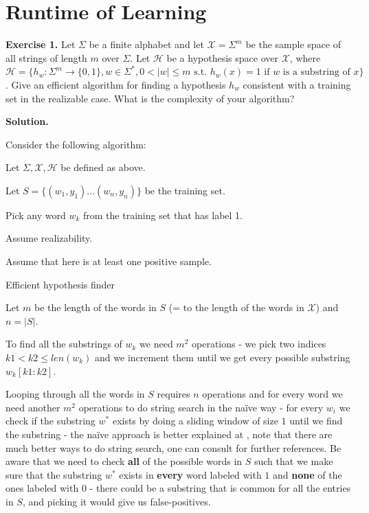 \documentclass{article}
\newcommand{\<}{\langle}
\renewcommand{\>}{\rangle}
\theoremstyle{definition}
\begin{document}
\newpage

\section{Runtime of Learning}

\textbf{Exercise 1.} Let $\Sigma$ be a finite alphabet and let $\mathcal{X}=\Sigma^m$ be the sample space of all strings of length $m$ over $\Sigma$. Let $\mathcal{H}$ be a hypothesis space over $\mathcal{X}$, where $\mathcal{H}=\{h_{w}:\Sigma^m\to\{0,1\}, w \in \Sigma^*, 0 < |w| \leq m \text{ s.t. } h_w(x)=1 \text{ if } w \text{ is a substring of } x\}$. Give an efficient algorithm for finding a hypothesis $h_w$ consistent with a training set in the realizable case. What is the complexity of your algorithm?

\textbf{Solution.}

Consider the following algorithm:

\begin{algorithm}[H]
\SetAlgoLined
{}
 
 Let $\Sigma,\mathcal{X}, \mathcal{H}$ be defined as above.
 
 Let $S = \{(w_1, y_1)...(w_n, y_n)\}$ be the training set.
 
 Pick any word $w_k$ from the training set that has label 1.
 
 Assume realizability.

 Assume that here is at least one positive sample.
 
 \caption{Efficient hypothesis finder}
\end{algorithm}

Let $m$ be the length of the words in $S$ (= to the length of the words in $\mathcal{X}$) and $n=|S|$.

To find all the substrings of $w_k$ we need $m^2$ operations - we pick two indices $k1 < k2 \leq len(w_k)$ and we increment them until we get every possible substring $w_k[k1:k2]$.

Looping through all the words in $S$ requires $n$ operations and for every word we need another $m^2$ operations to do string search in the naïve way - for every $w_i$ we check if the substring $w^*$ exists by doing a sliding window of size $1$ until we find the substring - the naïve approach is better explained at \cite{wiki_naive}, note that there are much better ways to do string search, one can consult \cite{wiki_ss} for further references. Be aware that we need to check \textbf{all} of the possible words in $S$ such that we make sure that the substring $w^*$ exists in \textbf{every} word labeled with $1$ and \textbf{none} of the ones labeled with 0 - there could be a substring that is common for all the entries in $S$, and picking it would give us false-positives.
\end{document}
